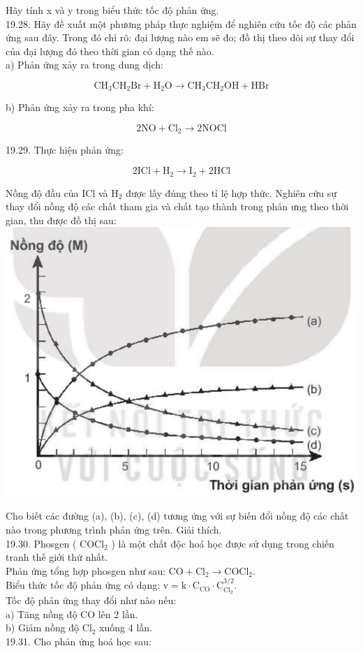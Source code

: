\documentclass[10pt]{article}
\begin{document}
Hãy tính x và y trong biểu thức tốc độ phản ứng.\\
19.28. Hãy đề xuất một phương pháp thực nghiệm để nghiên cứu tốc độ các phản ứng sau đây. Trong đó chỉ rõ: đại lượng nào em sẽ đo; đồ thị theo dõi sự thay đổi của đại lượng đó theo thời gian có dạng thế nào.\\
a) Phản ứng xảy ra trong dung dịch:

$$
\mathrm{CH}_{3} \mathrm{CH}_{2} \mathrm{Br}+\mathrm{H}_{2} \mathrm{O} \rightarrow \mathrm{CH}_{3} \mathrm{CH}_{2} \mathrm{OH}+\mathrm{HBr}
$$

b) Phản ứng xảy ra trong pha khí:

$$
2 \mathrm{NO}+\mathrm{Cl}_{2} \rightarrow 2 \mathrm{NOCl}
$$

19.29. Thực hiện phản ứng:

$$
2 \mathrm{ICl}+\mathrm{H}_{2} \rightarrow \mathrm{I}_{2}+2 \mathrm{HCl}
$$

Nồng độ đầu của ICl và $\mathrm{H}_{2}$ được lấy đúng theo tỉ lệ hợp thức. Nghiên cứu sự thay đổi nồng độ các chất tham gia và chất tạo thành trong phản ưng theo thời gian, thu được đồ thị sau:\\
\includegraphics[max width=\textwidth, center]{2025_10_23_daab5c8457c85b365b9eg-56}

Cho biết các đường (a), (b), (c), (d) tương ứng với sự biến đổi nồng độ các chất nào trong phương trình phản ứng trên. Giải thích.\\
19.30. Phosgen ( $\mathrm{COCl}_{2}$ ) là một chất độc hoá học được sử dụng trong chiến tranh thế giới thứ nhất.\\
Phản ứng tổng hợp phosgen như sau: $\mathrm{CO}+\mathrm{Cl}_{2} \rightarrow \mathrm{COCl}_{2}$.\\
Biểu thức tốc độ phản ứng có dạng: $\mathrm{v}=\mathrm{k} \cdot \mathrm{C}_{\mathrm{CO}} \cdot \mathrm{C}_{\mathrm{Cl}_{2}}^{3 / 2}$.\\
Tốc độ phản ứng thay đổi như nào nếu:\\
a) Tăng nồng độ CO lên 2 lần.\\
b) Giảm nồng độ $\mathrm{Cl}_{2}$ xuống 4 lần.\\
19.31. Cho phản ứng hoá học sau:
\end{document}
